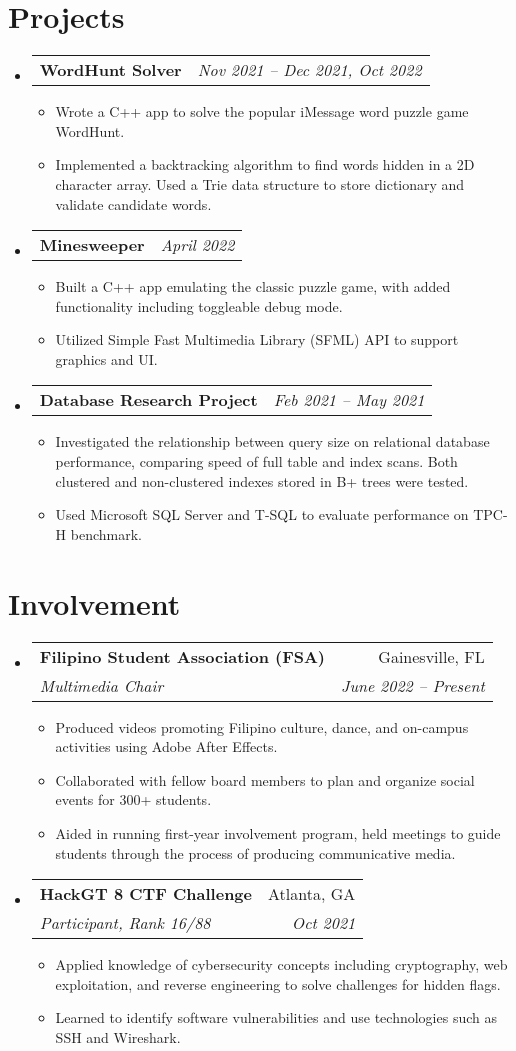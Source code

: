 \documentclass[letterpaper,11pt]{article}
\makeatletter
\newcommand{\resumeItemExperience}[1]{
  \item\small{
    {#1 \vspace{-2pt}}
  }
}
\newcommand{\resumeSubheading}[4]{
  \vspace{-1pt}\item
    \begin{tabular*}{0.97\textwidth}{l@{\extracolsep{\fill}}r}
      \textbf{#1} & #2 \\
      \textit{\small#3} & \textit{\small #4} \\
    \end{tabular*}\vspace{-6pt}
}
\newcommand{\resumeSubheadingProject}[2]{
  \vspace{-1pt}\item
    \begin{tabular*}{0.97\textwidth}{l@{\extracolsep{\fill}}r}
      \textbf{#1} & \textit{\small #2} \\
    \end{tabular*}\vspace{-5pt}
}
\newcommand{\resumeSubHeadingListStart}{\begin{itemize}[leftmargin=*, label={}]}
\newcommand{\resumeSubHeadingListEnd}{\end{itemize}}
\newcommand{\resumeItemListStart}{\begin{itemize}}
\newcommand{\resumeItemListEnd}{\end{itemize}\vspace{-5pt}}
\makeatother
\begin{document}
\section{Projects}
  \resumeSubHeadingListStart
        \resumeSubheadingProject
          {WordHunt Solver}{Nov 2021 -- Dec 2021, Oct 2022}
          \resumeItemListStart
            \resumeItemExperience
              {Wrote a C++ app to solve the popular iMessage word puzzle game WordHunt.}
            \resumeItemExperience
              {Implemented a backtracking algorithm to find words hidden in a 2D character array. Used a Trie data structure to store dictionary and validate candidate words.}
          \resumeItemListEnd
        \resumeSubheadingProject
          {Minesweeper}{April 2022}
          \resumeItemListStart
            \resumeItemExperience
              {Built a C++ app emulating the classic puzzle game, with added functionality including toggleable debug mode.}
            \resumeItemExperience
              {Utilized Simple Fast Multimedia Library (SFML) API to support graphics and UI.}
          \resumeItemListEnd
          \resumeSubheadingProject
          {Database Research Project}{Feb 2021 -- May 2021}
          \resumeItemListStart
            \resumeItemExperience
              {Investigated the relationship between query size on relational database performance, comparing speed of full table and index scans. Both clustered and non-clustered indexes stored in B+ trees were tested.}
            \resumeItemExperience
              {Used Microsoft SQL Server and T-SQL to evaluate performance on TPC-H benchmark.}
          \resumeItemListEnd
    \resumeSubHeadingListEnd
    
\section{Involvement}
    \resumeSubHeadingListStart
      \resumeSubheading
        {Filipino Student Association (FSA)}{Gainesville, FL}
        {Multimedia Chair}{June 2022 -- Present}
        \resumeItemListStart
          \resumeItemExperience
            {Produced videos promoting Filipino culture, dance, and on-campus activities using Adobe After Effects.}
          \resumeItemExperience
            {Collaborated with fellow board members to plan and organize social events for 300+ students.}
          \resumeItemExperience
            {Aided in running first-year involvement program, held meetings to guide students through the process of producing communicative media.}
        \resumeItemListEnd
      \resumeSubheading
        {HackGT 8 CTF Challenge}{Atlanta, GA}
        {Participant, Rank 16/88}{Oct 2021}
        \resumeItemListStart
          \resumeItemExperience
            {Applied knowledge of cybersecurity concepts including cryptography, web exploitation, and reverse engineering to solve challenges for hidden flags.}
             \resumeItemExperience
            {Learned to identify software vulnerabilities and use technologies such as SSH and Wireshark.}
        \resumeItemListEnd
    \resumeSubHeadingListEnd
          
\end{document}
